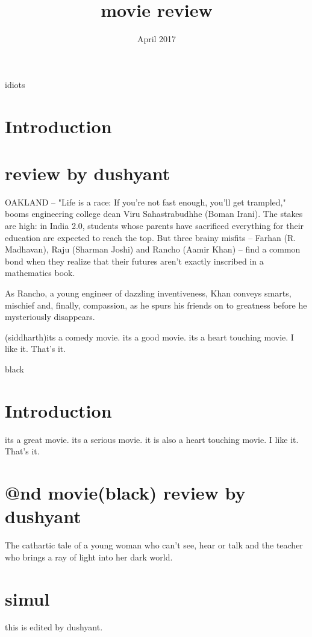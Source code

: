 \documentclass{article}
\title{movie review}
\date{April 2017}
\begin{document}
 idiots
\section{Introduction}

\section{review by dushyant}
OAKLAND -- "Life is a race: If you're not fast enough, you'll get trampled," booms engineering college dean Viru Sahastrabudhhe (Boman Irani). The stakes are high: in India 2.0, students whose parents have sacrificed everything for their education are expected to reach the top. But three brainy misfits -- Farhan (R. Madhavan), Raju (Sharman Joshi) and Rancho (Aamir Khan) -- find a common bond when they realize that their futures aren't exactly inscribed in a mathematics book.

As Rancho, a young engineer of dazzling inventiveness, Khan conveys smarts, mischief and, finally, compassion, as he spurs his friends on to greatness before he mysteriously disappears.


(siddharth)its a comedy movie. its a good movie. its a heart touching movie. I like it. That's it.  


\maketitle
black
\section{Introduction}
its a great movie. its a serious movie. it is also a heart touching movie. I like it. That's it.

\section{@nd movie(black) review by dushyant}
The cathartic tale of a young woman who can't see, hear or talk and the teacher who brings a ray of light into her dark world.
\section{simul}
this is edited by dushyant. 
\end{document}
